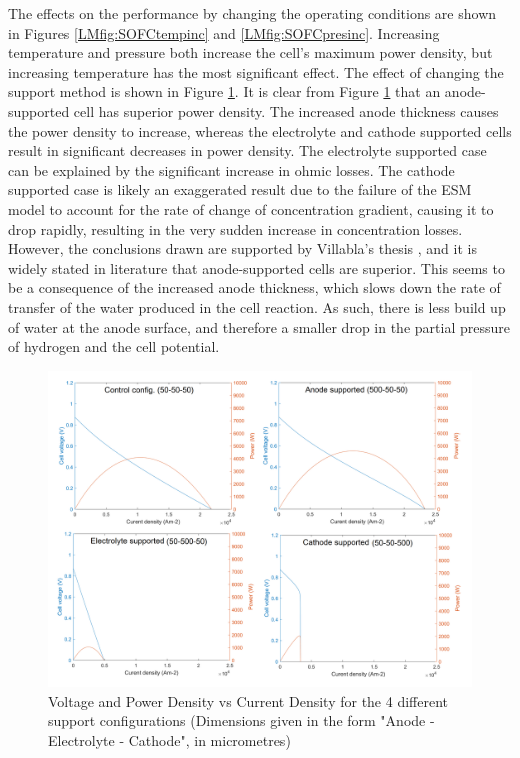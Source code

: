     The effects on the performance by changing the operating conditions are shown in Figures \ref{LMfig:SOFCtempinc} and \ref{LMfig:SOFCpresinc}. Increasing temperature and pressure both increase the cell's maximum power density, but increasing temperature has the most significant effect.
    The effect of changing the support method is shown in Figure \ref{LMfig:SOFCsupport}.
        It is clear from Figure \ref{LMfig:SOFCsupport} that an anode-supported cell has superior power density. The increased anode thickness causes the power density to increase, whereas the electrolyte and cathode supported cells result in significant decreases in power density. The electrolyte supported case can be explained by the significant increase in ohmic losses. The cathode supported case is likely an exaggerated result due to the failure of the ESM model to account for the rate of change of concentration gradient, causing it to drop rapidly, resulting in the very sudden increase in concentration losses. However, the conclusions drawn are supported by Villabla's thesis \cite{LM2}, and it is widely stated in literature that anode-supported cells are superior. This seems to be a consequence of the increased anode thickness, which slows down the rate of transfer of the water produced in the cell reaction. As such, there is less build up of water at the anode surface, and therefore a smaller drop in the partial pressure of hydrogen and the cell potential.
    \\
  
  \begin{figure}[h]
      \centering
      \includegraphics[scale=0.6]{support_comparison.png}
      \caption{Voltage and Power Density vs Current Density for the 4 different support configurations (Dimensions given in the form "Anode - Electrolyte - Cathode", in micrometres)}
      \label{LMfig:SOFCsupport}
  \end{figure}

